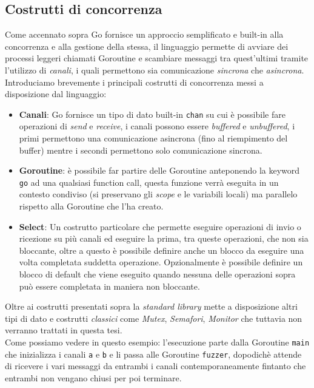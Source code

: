 \subsection{Costrutti di concorrenza}
Come accennato sopra Go fornisce un approccio semplificato e built-in alla concorrenza e alla gestione della stessa, il linguaggio permette di avviare dei processi leggeri chiamati Goroutine e scambiare messaggi tra quest'ultimi tramite l'utilizzo di \emph{canali}, i quali permettono sia comunicazione \emph{sincrona} che \emph{asincrona}.\\
Introduciamo brevemente i principali costrutti di concorrenza messi a disposizione dal linguaggio:
\begin{itemize}
    \item \textbf{Canali}: Go fornisce un tipo di dato built-in \texttt{chan} su cui è possibile fare operazioni di \emph{send} e \emph{receive}, i canali possono essere \emph{buffered} e \emph{unbuffered}, i primi permettono una comunicazione asincrona (fino al riempimento del buffer) mentre i secondi permettono solo comunicazione sincrona.
    \item \textbf{Goroutine}: è possibile far partire delle Goroutine anteponendo la keyword \texttt{go} ad una qualsiasi function call, questa funzione verrà eseguita in un contesto condiviso (si preservano gli \emph{scope} e le variabili locali) ma parallelo rispetto alla Goroutine che l'ha creato.
    \item \textbf{Select}: Un costrutto particolare che permette eseguire operazioni di invio o ricezione su più canali ed eseguire la prima, tra queste operazioni, che non sia bloccante, oltre a questo è possibile definire anche un blocco da eseguire una volta completata suddetta operazione. Opzionalmente è possibile definire un blocco di default che viene eseguito quando nessuna delle operazioni sopra può essere completata in maniera non bloccante.
\end{itemize}
Oltre ai costrutti presentati sopra la \emph{standard library} mette a disposizione altri tipi di dato e costrutti \emph{classici} come \emph{Mutex}, \emph{Semafori}, \emph{Monitor} che tuttavia non verranno trattati in questa tesi. \\

\bigskip
Come possiamo vedere in questo esempio: l'esecuzione parte dalla Goroutine \texttt{main} che inizializza i canali \texttt{a} e \texttt{b} e li passa alle Goroutine \texttt{fuzzer}, dopodichè attende di ricevere i vari messaggi da entrambi i canali contemporaneamente fintanto che entrambi non vengano chiusi per poi terminare.

